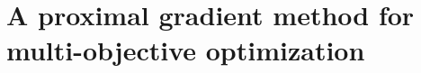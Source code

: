 \documentclass[../main]{subfiles}
\begin{document}
\chapter{A proximal gradient method for multi-objective optimization} 














\end{document}
